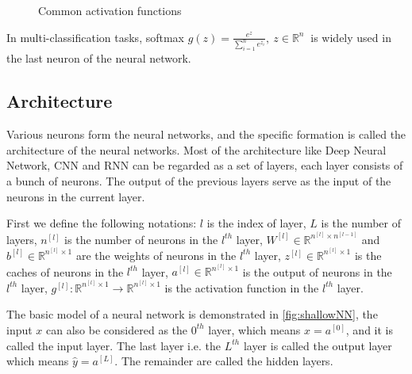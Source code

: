\begin{figure}[H]
    \centering
    \centering
    \caption{\label{fig:activation}Common activation functions}
\end{figure}
\par In multi-classification tasks, softmax 
$ g(z) = \frac{e^z}{\sum\limits_{i=1}^{n}e^{z_i}},\ z \in \mathbb{R}^n\ $
is widely used in the last neuron of the neural network.

\subsection{Architecture}
Various neurons form the neural networks, and the specific formation is called
the architecture of the neural networks. Most of the architecture like 
Deep Neural Network, CNN and RNN can be regarded as a set of layers, 
each layer consists of a bunch of neurons. The output of the previous layers
serve as the input of the neurons in the current layer.

First we define the following notations: $ l $ is the index of layer,
$ L $ is the number of layers, $ n^{[l]} $ is the number of neurons 
in the $ l^{th} $ layer, $ W^{[l]} \in \mathbb{R}^{n^{[l]}\times n^{[l-1]}} $ 
and $ b^{[l]} \in \mathbb{R}^{n^{[l]}\times 1 } $ are the weights of neurons 
in the $ l^{th} $ layer, $ z^{[l]} \in \mathbb{R}^{n^{[l]}\times 1} $ is 
the caches of neurons in the $ l^{th} $ layer, 
$ a^{[l]} \in \mathbb{R}^{n^{[l]}\times 1} $ is the output of neurons 
in the $ l^{th} $ layer, 
$ g^{[l]}: \mathbb{R}^{n^{[l]}\times 1} \rightarrow \mathbb{R}^{n^{[l]}\times 1} $ 
is the activation function in the $ l^{th} $ layer.
\par The basic model of a neural network is demonstrated in \autoref{fig:shallowNN},
the input $ x $ can also be considered as the $ 0^{th} $ layer, which means
$ x = a^{[0]} $, and it is called the input layer. The last layer i.e. the $ L^{th} $
layer is called the output layer which means $ \hat{y} = a^{[L]} $. 
The remainder are called the hidden layers. 

